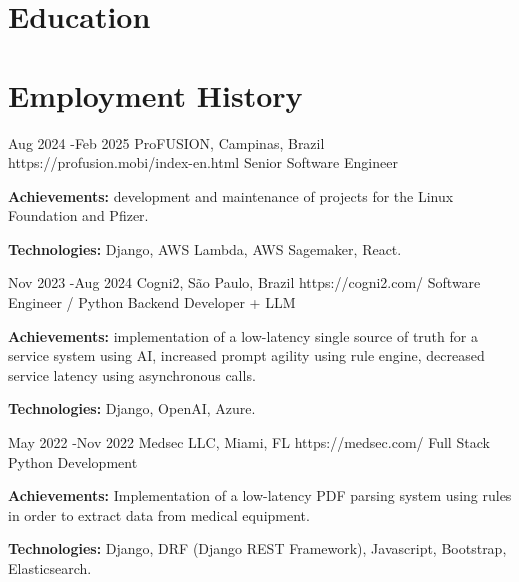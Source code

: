 \documentclass[10pt]{article} %
\begin{document}

\section{Education}



\section{Employment History}

\job
{Aug 2024 -}{Feb 2025}
{ProFUSION, Campinas, Brazil}
{https://profusion.mobi/index-en.html}
{Senior Software Engineer}
{\rule{0mm}{2mm}\textbf{Achievements:} development and maintenance of projects for the Linux Foundation and Pfizer.\\
\rule{0mm}{3mm}\textbf{Technologies:} Django, AWS Lambda, AWS Sagemaker, React.}


\job
{Nov 2023 -}{Aug 2024}
{Cogni2, São Paulo, Brazil}
{https://cogni2.com/}
{Software Engineer / Python Backend Developer + LLM}
{\rule{0mm}{2mm}\textbf{Achievements:} implementation of a low-latency single source of truth for a service system using AI, increased prompt agility using rule engine, decreased service latency using asynchronous calls.\\
\rule{0mm}{3mm}\textbf{Technologies:} Django, OpenAI, Azure.}


\job
{May 2022 -}{Nov 2022}
{Medsec LLC, Miami, FL}
{https://medsec.com/}
{Full Stack Python Development}
{\rule{0mm}{2mm}\textbf{Achievements:} Implementation of a low-latency PDF parsing system using rules in order to extract data from medical equipment.\\
\rule{0mm}{3mm}\textbf{Technologies:} Django, DRF (Django REST Framework), Javascript, Bootstrap, Elasticsearch.}
\end{document}
